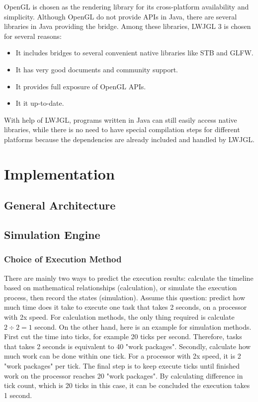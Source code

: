 \documentclass[msc,deptreport, cs]{infthesis}
\begin{document}
OpenGL is chosen as the rendering library for its cross-platform availability and simplicity. Although OpenGL do not provide APIs in Java, there are several libraries in Java providing the bridge. Among these libraries, LWJGL 3 is chosen for several reasons:

\begin{itemize}
  \vspace{-1em}\item It includes bridges to several convenient native libraries like STB and GLFW.
  \vspace{-1em}\item It has very good documents and community support.
  \vspace{-1em}\item It provides full exposure of OpenGL APIs.
  \vspace{-1em}\item It it up-to-date.
\end{itemize}

With help of LWJGL, programs written in Java can still easily access native libraries, while there is no need to have special compilation steps for different platforms because the dependencies are already included and handled by LWJGL.

\chapter{Implementation}

\section{General Architecture}

\section{Simulation Engine}

\subsection{Choice of Execution Method}

There are mainly two ways to predict the execution results: calculate the timeline based on mathematical relationships (calculation), or simulate the execution process, then record the states (simulation). Assume this question: predict how much time does it take to execute one task that takes 2 seconds, on a processor with 2x speed. For calculation methods, the only thing required is calculate $2\div 2 = 1$ second. On the other hand, here is an example for simulation methods. First cut the time into ticks, for example 20 ticks per second. Therefore, tasks that takes 2 seconds is equivalent to 40 "work packages". Secondly, calculate how much work can be done within one tick. For a processor with 2x speed, it is 2 "work packages" per tick. The final step is to keep execute ticks until finished work on the processor reaches 20 "work packages". By calculating difference in tick count, which is 20 ticks in this case, it can be concluded the execution takes 1 second.
\end{document}
